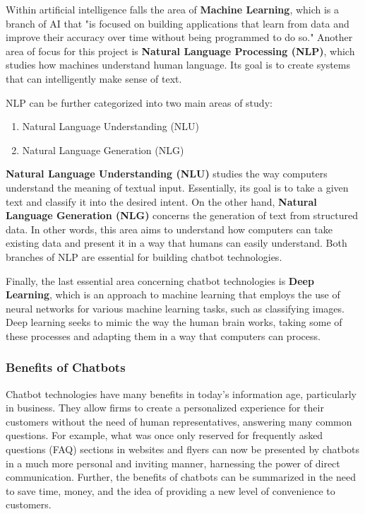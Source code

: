 \documentclass[titlepage, 12pt]{article}
\begin{document}
Within artificial intelligence falls the area of \textbf{Machine Learning}, which is a branch of AI that "is focused on building applications that learn from data and improve their accuracy over time without being programmed to do so." Another area of focus for this project is \textbf{Natural Language Processing (NLP)}, which studies how machines understand human language. Its goal is to create systems that can intelligently make sense of text.

NLP can be further categorized into two main areas of study:

\begin{enumerate}
    \item Natural Language Understanding (NLU)
    \item Natural Language Generation (NLG)
\end{enumerate}

\textbf{Natural Language Understanding (NLU)} studies the way computers understand the meaning of textual input. Essentially, its goal is to take a given text and classify it into the desired intent. On the other hand, \textbf{Natural Language Generation (NLG)} concerns the generation of text from structured data. In other words, this area aims to understand how computers can take existing data and present it in a way that humans can easily understand. Both branches of NLP are essential for building chatbot technologies.

Finally, the last essential area concerning chatbot technologies is \textbf{Deep Learning}, which is an approach to machine learning that employs the use of neural networks for various machine learning tasks, such as classifying images. Deep learning seeks to mimic the way the human brain works, taking some of these processes and adapting them in a way that computers can process.

\subsubsection{Benefits of Chatbots}

Chatbot technologies have many benefits in today's information age, particularly in business. They allow firms to create a personalized experience for their customers without the need of human representatives, answering many common questions. For example, what was once only reserved for frequently asked questions (FAQ) sections in websites and flyers can now be presented by chatbots in a much more personal and inviting manner, harnessing the power of direct communication. Further, the benefits of chatbots can be summarized in the need to save time, money, and the idea of providing a new level of convenience to customers.
\end{document}
